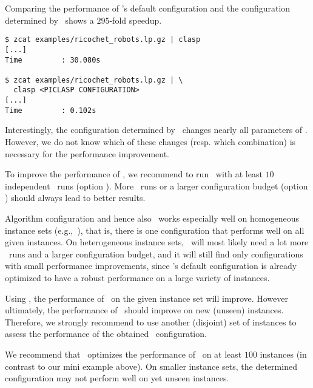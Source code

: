 Comparing the performance of \clasp's default configuration
and the configuration determined by \piclasp\ shows a $295$-fold speedup.

\begin{lstlisting}[numbers=none]
$ zcat examples/ricochet_robots.lp.gz | clasp
[...]
Time         : 30.080s

$ zcat examples/ricochet_robots.lp.gz | \
  clasp <PICLASP CONFIGURATION>
[...]
Time         : 0.102s
\end{lstlisting}

Interestingly, the configuration determined by \piclasp\ changes nearly all parameters of \clasp.
However, we do not know which of these changes (resp. which combination) 
is necessary for the performance improvement.

\begin{note}
To improve the performance of \piclasp, 
we recommend to run \piclasp\ with at least $10$ independent \smac\ runs (option ).
More \smac\ runs or a larger configuration budget (option \code{--budget,-B}) should always lead to better results.   
\end{note}

\begin{note}
Algorithm configuration and hence also \piclasp\ works especially well on homogeneous instance sets (e.g.,~\cite{gejokaobsascsc13a}),
that is, there is one configuration that performs well on all given instances.
On heterogeneous instance sets, \piclasp\ will most likely need a lot more \smac\ runs and a larger configuration budget,
and it will still find only configurations with small performance improvements, 
since \clasp's default configuration is already optimized to have a robust performance on a large variety of instances.
\end{note}

\begin{note}
Using \piclasp, the performance of \clasp\ on the given instance set will improve.
However ultimately, the performance of \clasp\ should improve on new (unseen) instances.
Therefore, we strongly recommend to use another (disjoint) set of instances to assess the performance of the obtained \clasp\ configuration.
\end{note}

\begin{note}
We recommend that \piclasp\ optimizes the performance of \clasp\ on at least $100$ instances 
(in contrast to our mini example above).
On smaller instance sets, the determined configuration may not perform well on yet unseen instances.
\end{note}


